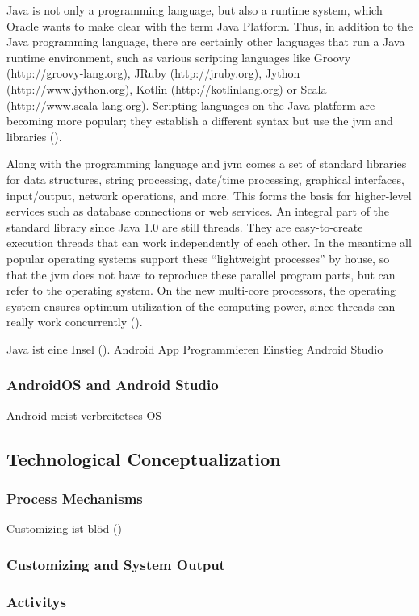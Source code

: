 Java is not only a programming language, but also a runtime system, which Oracle wants to make clear with the term Java Platform. Thus, in addition to the Java programming language, there are certainly other languages that run a Java runtime environment, such as various scripting languages like Groovy (http://groovy-lang.org), JRuby (http://jruby.org), Jython (http://www.jython.org), Kotlin (http://kotlinlang.org) or Scala (http://www.scala-lang.org). Scripting languages on the Java platform are becoming more popular; they establish a different syntax but use the \ac{jvm} and libraries (\cite{Ullenboom.2017}).

Along with the programming language and \ac{jvm} comes a set of standard libraries for data structures, string processing, date/time processing, graphical interfaces, input/output, network operations, and more. This forms the basis for higher-level services such as database connections or web services. An integral part of the standard library since Java 1.0 are still threads. They are easy-to-create execution threads that can work independently of each other. In the meantime all popular operating systems support these \enquote{lightweight processes} by house, so that the \ac{jvm} does not have to reproduce these parallel program parts, but can refer to the operating system. On the new multi-core processors, the operating system ensures optimum utilization of the computing power, since threads can really work concurrently (\cite{Ullenboom.2017}).





Java ist eine Insel (\cite{Ullenboom.2017}).
Android App Programmieren Einstieg Android Studio \cite{Richter.2019}

\subsubsection{AndroidOS and Android Studio}

Android meist verbreitetses OS \cite{statcounter.2023}


\subsection{Technological Conceptualization}

\subsubsection{Process Mechanisms}

Customizing ist blöd (\cite{Chou.2008})

\subsubsection{Customizing and System Output}

\subsubsection{Activitys}

